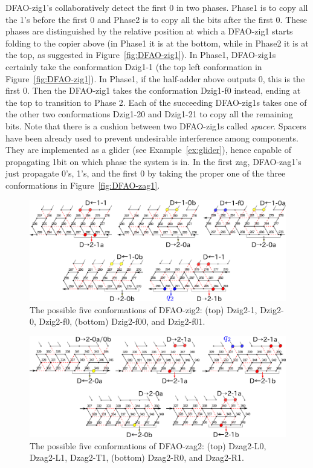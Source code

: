 DFAO-zig1's collaboratively detect the first 0 in two phases.
Phase1 is to copy all the 1's before the first 0 and Phase2 is to copy all the bits after the first 0.
These phases are distinguished by the relative position at which a DFAO-zig1 starts folding to the copier above (in Phase1 it is at the bottom, while in Phase2 it is at the top, as suggested in Figure~\ref{fig:DFAO-zig1}).
In Phase1, DFAO-zig1s certainly take the conformation Dzig1-1 (the top left conformation in Figure~\ref{fig:DFAO-zig1}).
In Phase1, if the half-adder above outputs 0, this is the first 0. 
Then the DFAO-zig1 takes the conformation Dzig1-f0 instead, ending at the top to transition to Phase 2.
Each of the succeeding DFAO-zig1s takes one of the other two conformations Dzig1-20 and Dzig1-21 to copy all the remaining bits. 
Note that there is a cushion between two DFAO-zig1s called \textit{spacer}.
Spacers have been already used to prevent undesirable interference among components.
They are implemented as a glider (see Example~\ref{ex:glider}), hence capable of propagating 1bit on which phase the system is in.
In the first zag, DFAO-zag1's just propagate 0's, 1's, and the first 0 by taking the proper one of the three conformations in Figure~\ref{fig:DFAO-zag1}.

\begin{figure}[h]
\includegraphics[width=\linewidth]{pic/DFAO-zig2.png}
  \caption{The possible five conformations of DFAO-zig2: (top) Dzig2-1, Dzig2-0, Dzig2-f0, (bottom) Dzig2-f00, and Dzig2-f01. }
  \label{fig:DFAO-zig2}
\end{figure} 

\begin{figure}[h]
\includegraphics[width=\linewidth]{pic/DFAO-zag2.png}
  \caption{The possible five conformations of DFAO-zag2: (top) Dzag2-L0, Dzag2-L1, Dzag2-T1, (bottom) Dzag2-R0, and Dzag2-R1.}
  \label{fig:DFAO-zag2}
  \end{figure} 

